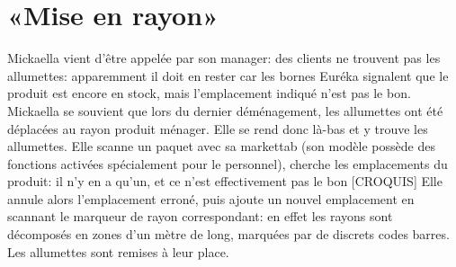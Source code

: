\section{«Mise en rayon»}
Mickaella vient d'être appelée par son manager: des clients ne trouvent pas les allumettes: apparemment il doit en rester car les bornes Euréka signalent que le produit est encore en stock, mais l'emplacement indiqué n'est pas le bon.
Mickaella se souvient que lors du dernier déménagement, les allumettes ont été déplacées au rayon produit ménager.
Elle se rend donc là-bas et y trouve les allumettes.
Elle scanne un paquet avec sa markettab (son modèle possède des fonctions activées spécialement pour le personnel), cherche les emplacements du produit: il n'y en a qu'un, et ce n'est effectivement pas le bon [CROQUIS]
Elle annule alors l'emplacement erroné, puis ajoute un nouvel emplacement en scannant le marqueur de rayon correspondant: en effet les rayons sont décomposés en zones d'un mètre de long, marquées par de discrets codes barres.
Les allumettes sont remises à leur place.
